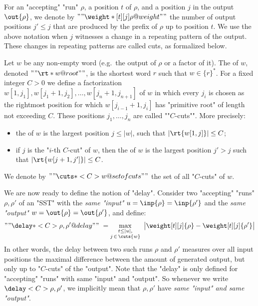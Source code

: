 \documentclass{theoretics}
\begin{document}
\AP
For an
"accepting" "run" $\rho$, a position $t$ of $\rho$, 
and a position $j$ in the output $\out{\rho}$, we denote by
$""\weight*[t][j]{\rho}@weight""$ %
the number of output positions $j'\le j$ that are produced by 
the prefix of $\rho$ up to position $t$.
We use the above notation when $j$ witnesses
a change in a repeating pattern of the output. These changes in repeating patterns are called cuts, as formalized below.

Let $w$ be any non-empty word (e.g.~the output of $\rho$ or a factor of it).
\AP
The  of $w$, denoted $""\rt*{w} @root""$, 
is the shortest word $r$ such that $w \in \{r\}^*$.
\AP
For a fixed integer $C>0$ we define a factorization 
$w[1,j_1],w[j_1+1,j_2],\dots,w[j_n + 1,j_{n+1}]$
of $w$ in which every $j_i$ is chosen as the rightmost 
position for which $w[j_{i-1}+1, j_i]$ has "primitive root" 
of length not exceeding $C$.
These positions $j_1,\dots,j_n$ are called ""$C$-cuts"".
More precisely:
\begin{itemize}
\item the  of $w$ is the largest position $j\le |w|$, 
      such that $|\rt{w[1,j]}| \le C$;
\item if $j$ is the "$i$-th $C$-cut" of $w$,
      then the   of $w$ 
      is the largest position $j'>j$ such that 
      $|\rt{w[j+1,j']}| \le C$.
\end{itemize}
\AP
We denote by $""\cuts*<C>{w}@set of cuts""$ 
the set of all "$C$-cuts" of $w$.

\AP
We are now ready to define the notion of "delay".
Consider two "accepting" "runs" $\rho,\rho'$ of an "SST" 
with the \emph{same "input"} $u=\inp{\rho}=\inp{\rho'}$ and the 
\emph{same "output"} $w=\out{\rho}=\out{\rho'}$,
and define:
\[
  ""\delay*<C>{\rho,\rho'}@delay"" ~= 
  \max\limits_{\substack{t\le |u|, \\ j\,\in\,\cuts{w}}} ~ 
  \big| \weight[t][j]{\rho} - \weight[t][j]{\rho'} \big|
\]
In other words, the delay between two such runs $\rho$ and $\rho'$ measures over all input positions the maximal difference between the amount of generated output, but only up to "$C$-cuts"  of the "output".
Note that the "delay" is only defined for "accepting" "runs" with 
same "input" and "output". 
So whenever we write $\delay<C>{\rho,\rho'}$, we implicitly mean 
that $\rho,\rho'$ have \emph{same "input" and same "output"}.
\end{document}
